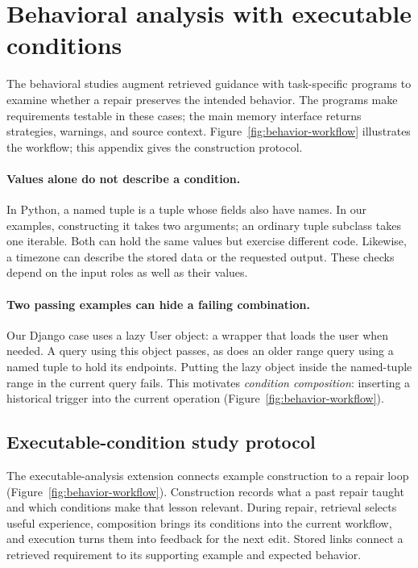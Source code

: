 \section{Behavioral analysis with executable conditions}
\label{sec:executable-analysis}
The behavioral studies augment retrieved guidance with task-specific
programs to examine whether a repair preserves the intended behavior.
The programs make requirements testable in these cases; the main memory
interface returns strategies, warnings, and source context.
Figure~\ref{fig:behavior-workflow} illustrates the workflow; this appendix
gives the construction protocol.
\paragraph{Values alone do not describe a condition.}
In Python, a named tuple is a tuple whose fields also have names. In our
examples, constructing it takes two arguments; an ordinary tuple subclass
takes one iterable. Both can hold the same values but exercise
different code. Likewise, a timezone can describe the stored data or the
requested output. These checks depend on the input roles as well as their values.

\paragraph{Two passing examples can hide a failing combination.}
Our Django case uses a lazy User object: a wrapper that loads the user when
needed. A query using this object passes, as does an older range query using
a named tuple to hold its endpoints. Putting the lazy object inside the
named-tuple range in the current query fails. This motivates
\emph{condition composition}: inserting a historical trigger into the current operation
(Figure~\ref{fig:behavior-workflow}).

\subsection{Executable-condition study protocol}
\label{sec:executable-protocol}
The executable-analysis extension connects example construction to a repair loop
(Figure~\ref{fig:behavior-workflow}). Construction records what a past repair taught
and which conditions make that lesson relevant. During repair, retrieval
selects useful experience, composition brings its conditions into the
current workflow, and execution turns them into feedback for the next edit.
Stored links connect a retrieved requirement to its supporting example and
expected behavior.

